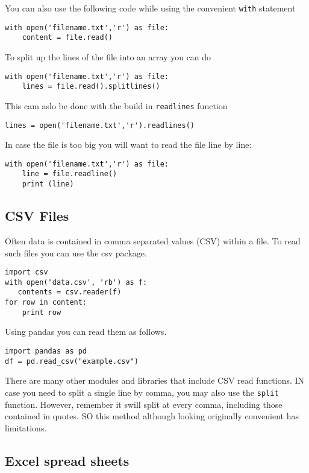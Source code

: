 You can also use the following code while using the convenient
\verb|with| statement

\begin{verbatim}
with open('filename.txt','r') as file:
    content = file.read()
\end{verbatim}

To split up the lines of the file into an array you can do

\begin{verbatim}
with open('filename.txt','r') as file:
    lines = file.read().splitlines()
\end{verbatim}


This cam aslo be done with the build in \verb|readlines| function
\begin{verbatim}
lines = open('filename.txt','r').readlines()
\end{verbatim}

In case the file is too big you will want to read the file line by
line:

\begin{verbatim}
with open('filename.txt','r') as file:
    line = file.readline()
    print (line)
\end{verbatim}


\subsection{CSV Files}

Often data is contained in comma separated values (CSV) within a
file. To read such files you can use the csv package.

\begin{verbatim}
import csv
with open('data.csv', 'rb') as f:
   contents = csv.reader(f)
for row in content:
    print row
\end{verbatim}

Using pandas you can read them as follows.

\begin{verbatim}
import pandas as pd
df = pd.read_csv("example.csv") 
\end{verbatim}

There are many other modules and libraries that include CSV read
functions. IN case you need to split a single line by comma, you may
also use the \verb|split| function. However, remember it swill split
at every comma, including those contained in quotes. SO this method
although looking originally convenient has limitations.

\subsection{Excel spread sheets}

